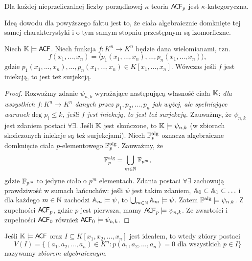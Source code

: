 \documentclass{article}
\begin{document}
\begin{fakt}
	Dla każdej nieprzeliczalnej liczby porządkowej $\kappa$ teoria $\mathsf{A \mkern-2.0mu C \mkern-1.1mu F}_p$ jest $\kappa$-kategoryczna.
\end{fakt}
Ideą dowodu dla powyższego faktu jest to, że ciała algebraicznie domknięte tej samej charakterystyki i o tym samym stopniu przestępnym są izomorficzne.

\begin{tw}[Ax--Grothendick]
	Niech $\mathbb{K} \models \mathsf{A \mkern-2.0mu C \mkern-1.1mu F}$.
	Niech funkcja $f \colon K^n \rightarrow K^n$ będzie dana wielomianami, tzn. $$f(x_1, \ldots, x_n) = \langle p_1(x_1, \ldots, x_n), \ldots, p_n(x_1, \ldots, x_n)\rangle ,$$ gdzie $p_1(x_1, \ldots, x_n), \ldots, p_n(x_1, \ldots, x_n) \in K[x_1, \ldots, x_n]$. %
	Wówczas jeśli $f$ jest iniekcją, to jest też surjekcją.
\end{tw}
\begin{proof}
	Rozważmy zdanie $\psi_{n,k}$ wyrażające następującą własność ciała $\mathbb{K}$:
	\textit{dla wszystkich $f \colon K^n \rightarrow K^n$ danych przez $p_1, p_2, \ldots, p_n$ jak wyżej, ale spełniające warunek $\text{deg } p_i \leq k$, jeśli $f$ jest iniekcją, to jest też surjekcją. }
	Zauważmy, że $\psi_{n,k}$ jest zdaniem postaci $\forall \exists$.
	Jeśli $\mathbb{K}$ jest skończone, to $\mathbb{K} \models \psi_{n,k}$ (w zbiorach skończonych iniekcje są też surjekcjami). %
	Niech $\mathbb{F}^{\text{alg}}_{p}$ oznacza algebraiczne domknięcie ciała $p$-elementowego $\mathbb{F}^{\text{alg}}_p$.
	Zauważmy, że $$\mathbb{F}^{\text{alg}}_{p} = \bigcup_{m \in \mathbb{N}} \mathbb{F}_{p^m},$$ gdzie $\mathbb{F}_{p^m}$ to jedyne ciało o $p^m$ elementach.
	Zdania postaci $\forall \exists$ zachowują prawdziwość w sumach łańcuchów:
	jeśli $\psi$ jest takim zdaniem, $\mathbb{A}_0 \subset \mathbb{A}_1 \subset \ldots $ i dla każdego $m \in \mathbb{N}$ zachodzi $\mathbb{A}_m \models \psi$, to $\bigcup_{m \in \mathbb{N}} \mathbb{A}_m \models \psi$.
	Zatem $\mathbb{F}^{\text{alg}} \models \psi_{n,k}$. %
	Z zupełności $\mathsf{A \mkern-2.0mu C \mkern-1.1mu F}_p$, gdzie $p$ jest pierwsza, mamy $\mathsf{A \mkern-2.0mu C \mkern-1.1mu F}_p \models \psi_{n,k}$.
	Ze zwartości i zupełności $\mathsf{A \mkern-2.0mu C \mkern-1.1mu F}_0$ również $\mathsf{A \mkern-2.0mu C \mkern-1.1mu F}_0 \models \psi_{n,k}$.

\end{proof}

\begin{df}
	Jeśli $\mathbb{K} \models \mathsf{A \mkern-2.0mu C \mkern-1.1mu F}$ oraz $I \subseteq K[x_1, x_2, \ldots, x_n ]$ jest ideałem, to wtedy zbiory postaci $$V(I) = \{(a_1, a_2, \ldots, a_n) \in K^n \colon p( a_1, a_2, \ldots, a_n ) = 0 \text{ dla wszystkich } p \in I\}$$ nazywamy \textit{zbiorem algebraicznym}.
\end{df}
\end{document}
